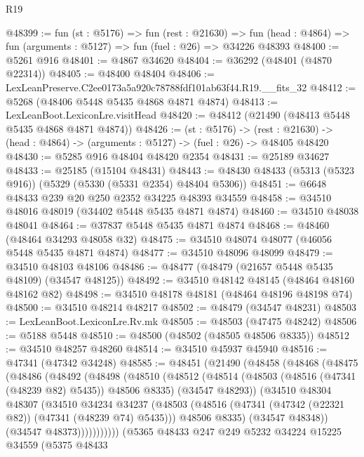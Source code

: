 \begin{lexlean}{R19}
\begin{coremodule}
@48399 := fun (st : @5176) =>
  fun (rest : @21630) =>
  fun (head : @4864) => fun (arguments : @5127) => fun (fuel : @26) => @34226 @48393
@48400 := @5261 @916
@48401 := @4867 @34620
@48404 := @36292 (@48401 (@4870 @22314))
@48405 := @48400 @48404
@48406 := LexLeanPreserve.C2ee0173a5a920c78788fdf101ab63f44.R19.__fits_32
@48412 := @5268 (@48406 @5448 @5435 @4868 @4871 @4874)
@48413 := LexLeanBoot.LexiconLre.visitHead
@48420 := @48412 (@21490 (@48413 @5448 @5435 @4868 @4871 @4874))
@48426 := (st : @5176) ->
  (rest : @21630) -> (head : @4864) -> (arguments : @5127) -> (fuel : @26) -> @48405 @48420
@48430 := @5285 @916 @48404 @48420 @2354
@48431 := @25189 @34627
@48433 := @25185 (@15104 @48431)
@48443 := @48430 @48433 (@5313 (@5323 @916)) (@5329 (@5330 (@5331 @2354) @48404 @5306))
@48451 := @6648 @48433 @239 @20 @250 @2352 @34225 @48393 @34559
@48458 := @34510 @48016 @48019 (@34402 @5448 @5435 @4871 @4874)
@48460 := @34510 @48038 @48041
@48464 := @37837 @5448 @5435 @4871 @4874
@48468 := @48460 (@48464 @34293 @48058 @32)
@48475 := @34510 @48074 @48077 (@46056 @5448 @5435 @4871 @4874)
@48477 := @34510 @48096 @48099
@48479 := @34510 @48103 @48106
@48486 := @48477 (@48479 (@21657 @5448 @5435 @48109) (@34547 @48125))
@48492 := @34510 @48142 @48145 (@48464 @48160 @48162 @82)
@48498 := @34510 @48178 @48181 (@48464 @48196 @48198 @74)
@48500 := @34510 @48214 @48217
@48502 := @48479 (@34547 @48231)
@48503 := LexLeanBoot.LexiconLre.Rv.mk
@48505 := @48503 (@47475 @48242)
@48506 := @5188 @5448
@48510 := @48500 (@48502 (@48505 @48506 @8335))
@48512 := @34510 @48257 @48260
@48514 := @34510 @45937 @45940
@48516 := @47341 (@47342 @34248)
@48585 := @48451
    (@21490
      (@48458
        (@48468
          (@48475
            (@48486
              (@48492
                (@48498
                  (@48510
                    (@48512
                      (@48514
                        (@48503 (@48516 (@47341 (@48239 @82) @5435)) @48506 @8335)
                        (@34547 @48293))
                      (@34510
                        @48304
                        @48307
                        (@34510
                          @34234
                          @34237
                          (@48503
                            (@48516 (@47341 (@47342 (@22321 @82)) (@47341 (@48239 @74) @5435)))
                            @48506
                            @8335)
                          (@34547 @48348))
                        (@34547 @48373)))))))))))
    (@5365
      @48433
      @247
      @249
      @5232
      @34224
      @15225
      @34559
      (@5375
        @48433

\end{coremodule}
\end{lexlean}
